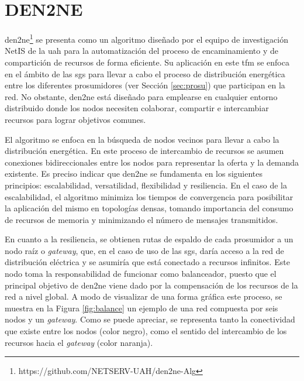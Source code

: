 \section{DEN2NE}
\label{sec:den2ne}

\acrfull{den2ne}\footnote{https://github.com/NETSERV-UAH/den2ne-Alg} \cite{den2ne} \cite{gitden2ne} se presenta como un algoritmo diseñado por el equipo de investigación NetIS de la \gls{uah} para la automatización del proceso de encaminamiento y de compartición de recursos de forma eficiente. Su aplicación en este \gls{tfm} se enfoca en el ámbito de las \gls{sg}s para llevar a cabo el proceso de distribución energética entre los diferentes prosumidores (ver Sección \ref{sec:prosu}) que participan en la red. No obstante, \gls{den2ne} está diseñado para emplearse en cualquier entorno distribuido donde los nodos necesiten colaborar, compartir e intercambiar recursos para lograr objetivos comunes.

\vspace{3mm} 

El algoritmo se enfoca en la búsqueda de nodos vecinos para llevar a cabo la distribución energética. En este proceso de intercambio de recursos se asumen conexiones bidireccionales entre los nodos para representar la oferta y la demanda existente. Es preciso indicar que \gls{den2ne} se fundamenta en los siguientes principios: escalabilidad, versatilidad, flexibilidad y resiliencia. En el caso de la escalabilidad, el algoritmo minimiza los tiempos de convergencia para posibilitar la aplicación del mismo en topologías densas, tomando importancia del consumo de recursos de memoria y minimizando el número de mensajes transmitidos. 

\vspace{3mm}

En cuanto a la resiliencia, se obtienen rutas de espaldo de cada prosumidor a un nodo raíz o \textit{gateway}, que, en el caso de uso de las \gls{sg}s, daría acceso a la red de distribución eléctrica y se asumiría que está conectado a recursos infinitos. Este nodo toma la responsabilidad de funcionar como balanceador, puesto que el principal objetivo de \gls{den2ne} viene dado por la compensación de los recursos de la red a nivel global. A modo de visualizar de una forma gráfica este proceso, se muestra en la Figura \ref{fig:balance} un ejemplo de una red compuesta por seis nodos y un \textit{gateway}. Como se puede apreciar, se representa tanto la conectividad que existe entre los nodos (color negro), como el sentido del intercambio de los recursos hacia el \textit{gateway} (color naranja). 

